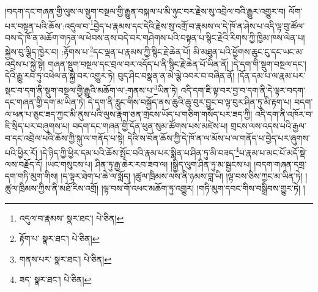 །བདག་དང་གཞན་གྱི་ལུས་ལ་སྡུག་བསྔལ་གྱི་རྒྱུན་བསྐལ་པ་མི་ཉུང་བར་རྗེས་སུ་འབྲེལ་བའི་རྒྱུར་འགྱུར་བ། ལོག་པར་བསྟན་པའི་ཆོས་:འདུལ་བ་\footnote{འདུལ་བ་རྣམས་  སྣར་ཐང་།  པེ་ཅིན། }བྱེད་པ་རྣམས་དང་དེའི་རྗེས་སུ་འགྲོ་བ་རྣམས་ལ་དེ་ཁོ་ན་ཤེས་པ་འདི་ལྟ་བུ་ཚོལ་བས་དེ་ཁོ་ན་མཆོག་གཏན་ལ་ཕེབས་ནས་བདེ་བར་གཤེགས་པའི་བསྟན་པ་སྙིང་རྗེའི་རིགས་ཀྱི་ཁྱིམ་ཁས་ལེན་པ། སྐྱེས་བུ་ལྕིད་ཁྱེར་བ། :རྟོགས་པ་\footnote{རྟོག་པ་  སྣར་ཐང་།  པེ་ཅིན། }དང་ལྡན་པ་རྣམས་ཀྱི་སྙིང་རྗེ་ཆེན་པོ། མི་མཐུན་པའི་ཕྱོགས་ཆུང་ངུ་དང་ཡང་མ་འདྲེས་པ་སྐྱེ་སྟེ། གཞན་སྡུག་བསྔལ་དང་བྲལ་བར་འདོད་པ་ནི་སྙིང་རྗེ་ཆེན་པོ་ཡིན་ནོ། །དེ་དག་གི་སྡུག་བསྔལ་དང་། དེའི་རྒྱུ་རབ་ཏུ་འཕེལ་ན་སྐྱེ་བར་འགྱུར་ཏེ། བུད་ཤིང་བསྣན་ན་མེ་ལྕེ་འབར་བ་བཞིན་ནོ། །དོན་དམ་པ་ལ་རྣམ་པར་སྡང་བ་དག་ནི་སྡུག་བསྔལ་གྱི་རྒྱུའི་མཆོག་ལ་:གནས་པ་\footnote{གནས་པར་  སྣར་ཐང་།  པེ་ཅིན། }ཡིན་ཏེ། འདི་དག་ཇི་ལྟ་བར་བྱ་བ་དག་ནི་དེ་ལྟར་བདག་དང་གཞན་གྱི་དག་མ་ཡིན་ཏེ། དེ་དག་ནི་རླུང་གིས་བསྐྱོད་ནས་ཆུའི་ཆུ་བུར་བྱུང་བ་ལྟ་བུར་ཤིན་ཏུ་མི་རྟག་པ། བདག་ལ་ཕན་པ་ཅུང་ཟད་ཀྱང་མི་ནུས་པའི་ལུས་རྣག་ཅན་གྲངས་ཡོད་པ་གཅིག་གསོད་པར་ཟད་ཀྱི། འདི་དག་ནི་འཁོར་བ་ཇི་སྲིད་པར་བཞུགས་པ། བདག་དང་གཞན་གྱི་དོན་ཕུན་སུམ་ཚོགས་པས་མཛེས་པ། གྲངས་ལས་འདས་པའི་རྒྱལ་བ་དང་འབྲེལ་པའི་ཆོས་ཀྱི་སྐུ་ལ་གནོད་པ་སྟེ། དེའི་ས་བོན་ཆོས་ཀྱི་དེ་ཁོ་ན་ལ་མོས་པ་ལ་གནོད་པ་བྱེད་པར་ཞུགས་པའི་ཕྱིར་རོ། །དེ་ཉིད་ཀྱི་ཕྱིར་དམ་པའི་ཆོས་སྤོང་བའི་རྣམ་པར་སྨིན་པ་ཤིན་ཏུ་མི་བཟད་\footnote{ཟད་  སྣར་ཐང་།  པེ་ཅིན། }པ་རྣམ་པ་མང་པོ་མདོ་སྡེ་ལས་བརྗོད་དོ། །ཡང་གསུངས་པ། ཤིན་ཏུ་རྒྱ་ཆེར་རབ་ཟབ་ལ། །སྒྱིད་ལུག་ཤིན་ཏུ་མ་སྦྱངས་པ། །བདག་གཞན་དགྲ་དག་གཏི་མུག་གིས། །ད་ལྟར་ཐེག་པ་ཆེ་ལ་སྨོད། །ཚུལ་ཁྲིམས་ལས་ནི་ཉམས་བླ་ཡི། །ལྟ་བས་ཅིས་ཀྱང་མ་ཡིན་ཏེ། །ཚུལ་ཁྲིམས་ཀྱིས་ནི་མཐོ་རིས་འགྲོ། །ལྟ་བས་གོ་འཕང་མཆོག་ཏུ་འགྱུར། །གཏི་མུག་དབང་གིས་བསྒྲིབས་གྱུར་ཏེ། །

